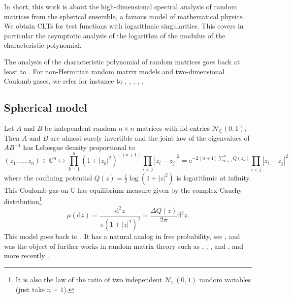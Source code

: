 \documentclass[10pt,reqno]{amsart}
\numberwithin{equation}{section}
\numberwithin{figure}{section}
\theoremstyle{plain}
\newcommand{\<}{\langle}
\renewcommand{\>}{\rangle}
\begin{document}
In short, this work is about the high-dimensional spectral analysis of random matrices from the spherical ensemble, a famous model of mathematical physics. We obtain CLTs for test functions with logarithmic singularities. This covers in particular the asymptotic analysis of the logarithm of the modulus of the characteristic polynomial.

The analysis of the characteristic polynomial of random matrices goes back at least to \cite{zbMATH01631908}. For non-Hermitian random matrix models and two-dimensional Coulomb gases, we refer for instance to \cite{zbMATH01921763}, \cite{zbMATH07115604}, \cite{MR3946715}, \cite{zbMATH08053185}, \cite{bourgadeetal}.

\subsection{Spherical model}

Let $A$ and $B$ be independent random $n\times n$ matrices with iid entries
$\mathcal{N}_{\mathbb{C}}(0,1)$. Then $A$ and $B$ are almost surely invertible
and the joint law of the eigenvalues of $AB^{-1}$ has Lebesgue density
proportional to
\begin{equation}\label{eq:gas:C}
  (z_1,\ldots,z_n)\in\mathbb{C}^n
  \mapsto\prod_{k=1}^n(1+|z_k|^2)^{-(n+1)}\prod_{i<j}|z_i-z_j|^2
  =\mathrm{e}^{-2(n+1)\sum_{k=1}^nQ(z_k)}\prod_{i<j}|z_i-z_j|^2
\end{equation}
where the confining potential $Q(z)=\frac{1}{2}\log(1+|z|^2)$ is logarithmic at infinity. This Coulomb gas on $\mathbb{C}$ has equilibrium measure given by the complex Cauchy distribution\footnote{It is also the law of the ratio of two independent $\mathcal{N}_{\mathbb{C}}(0,1)$ random variables (just take $n=1$).}
\begin{equation}
  \mu(\mathrm{d}z)
  =\frac{\mathrm{d}^2z}{\pi(1+|z|^2)^2}
  =\frac{\Delta Q(z)}{2\pi}\mathrm{d}^2z.
\end{equation}
This model goes back to \cite{Krishnapur2006,Krishnapur2009}. It has a natural analog in free probability, see \cite{zbMATH05361525}, and was the object of further works in random matrix theory such as \cite{MR2540391}, \cite{MR2346510}, \cite{MR2772389}, and \cite{MR2926763}, and more recently \cite{byun2025propertiesonecomponentcoulombgas}. 
\end{document}
